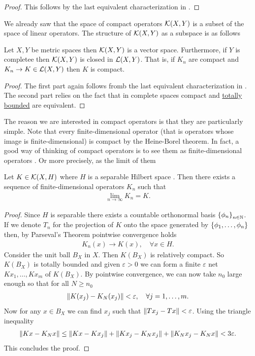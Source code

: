 \documentclass[
    a4paper,
    DIV=14,
    abstract=true,
    numbers=noenddot
]{scrartcl}
\begin{document}
	\begin{proof}
    This follows by the last equivalent characterization in .
	\end{proof}
  We already saw that the space of compact operators $\mathcal{K}(X,Y)$ is a subset of the space of linear operators. The structure of $\mathcal{K}(X,Y)$ as a subspace is as follows 
  \begin{proposition}
  Let $X,Y$ be metric spaces then  $\mathcal{K}(X,Y)$ is a vector space. Furthermore, if $Y$ is completee then  $\mathcal{K}(X,Y)$ is closed in $\mathcal{L}(X,Y)$. That is, if $K_n$ are compact and  $K_n \to K \in \mathcal{L}(X,Y)$ then $K$ is compact.
  \end{proposition}
  \begin{proof}
    The first part again follows fromb the last equivalent characterization in . The second part relies on the fact that in complete spaces compact and \href{https://en.wikipedia.org/wiki/Totally_bounded_space#:~:text=not%20in%20general.-,In,-metric%20spaces%5B}{totally bounded} are equivalent.
  \end{proof}
      
  The reason we are interested in compact operators is that they are particularly simple.
  Note that every finite-dimensional operator (that is operators whose image is finite-dimensional) is compact by the Heine-Borel theorem. In fact, a good way of thinking of compact operators is to see them as finite-dimensional operators . Or more precisely,
	as the limit of them
	\begin{proposition}
		Let $K \in  \mathcal{K}(X,H)$ where $H$ is a separable Hilbert space . Then there exists a sequence of finite-dimensional operators $K_n$ such that
		\begin{align*}
			\lim_{n \to \infty}K_n=K.
		\end{align*}
	\end{proposition}
	\begin{proof}
		Since $H$ is separable there exists a countable orthonormal basis $\left\{\phi_n\right\}_{n \in \mathbb{N}}$. If we denote $T_n$ for the projection of $K$ onto the space generated by  $\left\{\phi_1,\ldots,\phi_n\right\} $ then, by Parseval's Theorem pointwise convergence holds
		\begin{align*}
			K_n(x) \to K(x) , \quad\forall x \in  H.
		\end{align*}
		Consider the unit ball $B_X$ in  $X$. Then  $K(B_X)$ is relatively compact. So $K(B_X)$  is totally bounded and given $\varepsilon >0$ we can form a finite $\varepsilon $ net $Kx_1,\ldots,Kx_m $ of $K(B_X)$. By pointwise convergence, we can now take $n_0$ large enough so that for all $N \geq n_0$
\begin{align*}
\left\lVert K(x_j)-K_N(x_j) \right\rVert < \varepsilon, \quad\forall j=1,\ldots,m.
\end{align*}
		Now for any  $x\in B_X $ we can find $x_j$ such that  $\left\lVert Tx_j-Tx \right\rVert< \varepsilon $. Using the triangle inequality
		\begin{align*}
			\left\lVert Kx-K_N x \right\rVert \leq \left\lVert Kx-K x_j \right\rVert+ \left\lVert K x_j-K_N x_{j} \right\rVert+ \left\lVert K_N x_j-K_N x \right\rVert < 3\varepsilon .
		\end{align*}
		This concludes the proof.
	\end{proof}
	
\end{document}
